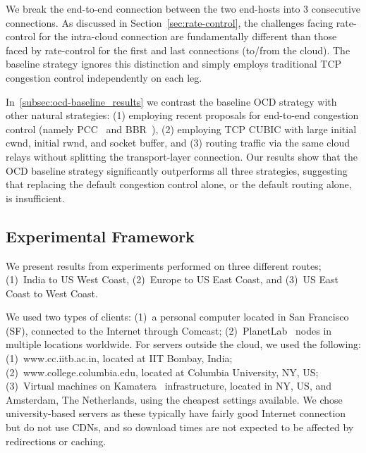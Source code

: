 \documentclass[newfonts=false,format=sigconf,anonymous,10pt,letterpaper]{acmart}
\begin{document}
\vspace{0.1in} We break the end-to-end connection between the two end-hosts into $3$ consecutive connections. As discussed in Section~\ref{sec:rate-control}, the challenges facing rate-control for the intra-cloud connection are fundamentally different than those faced by rate-control for the first and last connections (to/from the cloud). The baseline strategy ignores this distinction and simply employs traditional TCP congestion control independently on each leg.

\vspace{0.1in}\noindent
In~\ref{subsec:ocd-baseline_results} we contrast the baseline OCD strategy with other natural strategies: (1)  employing recent proposals for end-to-end congestion control (namely PCC~\cite{PCC} and BBR~\cite{BBR}), (2) employing TCP CUBIC with large initial cwnd, initial rwnd, and socket buffer,
and (3) routing traffic via the same cloud relays without splitting the transport-layer connection. Our results show that the OCD baseline strategy significantly outperforms all three strategies, suggesting that replacing the default congestion control alone, or the default routing alone, is insufficient.

\subsection{Experimental Framework}

\vspace{0.1in} 
We present results from experiments performed on three different routes; (1)~India to US West Coast, (2)~Europe to US East Coast, and (3)~US East Coast to West Coast.

\vspace{0.1in} We used two types of clients: (1)~a personal computer located in San Francisco (SF), connected to the Internet through Comcast; (2)~PlanetLab~\cite{PlanetLab} nodes in multiple locations worldwide.
For servers outside the cloud, we used the following:
(1)~www.cc.iitb.ac.in, located at IIT Bombay, India; (2)~www.college.columbia.edu, located at Columbia University, NY, US;
(3)~Virtual machines on Kamatera~\cite{kamatera} infrastructure, located in NY, US, and Amsterdam, The Netherlands, using the cheapest settings available. 
We chose university-based servers as these typically have fairly good Internet connection but do not use CDNs, and so download times are not expected to be affected by redirections or caching. 
\end{document}
